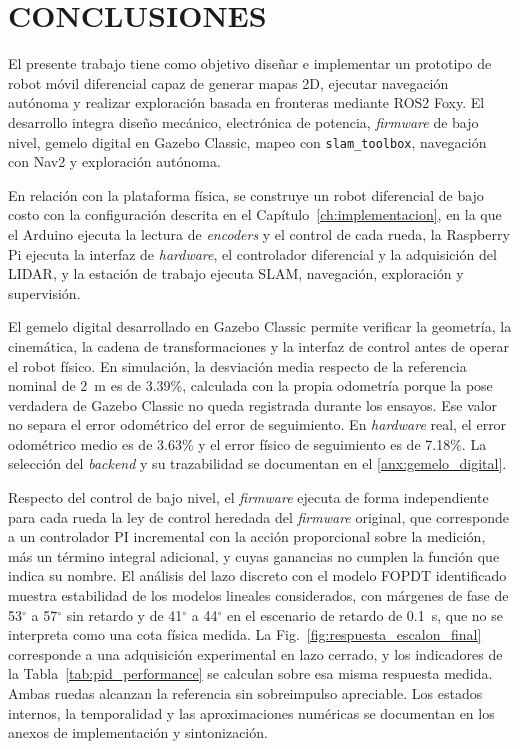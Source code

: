 \chapter*{CONCLUSIONES}
{}

El presente trabajo tiene como objetivo diseñar e implementar un prototipo de robot móvil diferencial capaz de generar mapas 2D, ejecutar navegación autónoma y realizar exploración basada en fronteras mediante \gls{ROS2} Foxy. El desarrollo integra diseño mecánico, electrónica de potencia, \textit{firmware} de bajo nivel, gemelo digital en Gazebo Classic, mapeo con \texttt{slam\_toolbox}, navegación con Nav2 y exploración autónoma.

En relación con la plataforma física, se construye un robot diferencial de bajo
costo con la configuración descrita en el Capítulo~\ref{ch:implementacion}, en
la que el \gls{Arduino} ejecuta la lectura de \textit{encoders} y el control de cada
rueda, la Raspberry Pi ejecuta la interfaz de \textit{hardware}, el controlador
diferencial y la adquisición del \gls{LIDAR}, y la estación de trabajo ejecuta
SLAM, navegación, exploración y supervisión.

El gemelo digital desarrollado en Gazebo Classic permite verificar la geometría,
la cinemática, la cadena de transformaciones y la interfaz de control antes de
operar el robot físico. En simulación, la desviación media respecto de la
referencia nominal de 2~m es de 3.39\%, calculada con la propia odometría porque
la pose verdadera de Gazebo Classic no queda registrada durante los ensayos. Ese valor
no separa el error odométrico del error de seguimiento. En \textit{hardware} real, el
error odométrico medio es de 3.63\% y el error físico de seguimiento es de 7.18\%.
La selección del \textit{backend} y su trazabilidad se documentan en el
\ref{anx:gemelo_digital}.

Respecto del control de bajo nivel, el \textit{firmware} ejecuta de forma independiente
para cada rueda la ley de control heredada del \textit{firmware} original, que
corresponde a un controlador PI incremental con la acción
proporcional sobre la medición, más un término integral adicional, y cuyas
ganancias no cumplen la función que indica su nombre. El análisis del lazo
discreto con el modelo FOPDT identificado muestra estabilidad de los modelos
lineales considerados, con
márgenes de fase de 53$^\circ$ a 57$^\circ$ sin retardo y de 41$^\circ$ a
44$^\circ$ en el escenario de retardo de 0.1~s, que no se interpreta como
una cota física medida. La Fig.~\ref{fig:respuesta_escalon_final} corresponde a una
adquisición experimental en lazo cerrado, y los indicadores de la
Tabla~\ref{tab:pid_performance} se calculan sobre esa misma respuesta medida.
Ambas ruedas alcanzan la referencia sin sobreimpulso apreciable. Los estados internos, la
temporalidad y las aproximaciones numéricas se documentan en los anexos de
implementación y sintonización.

